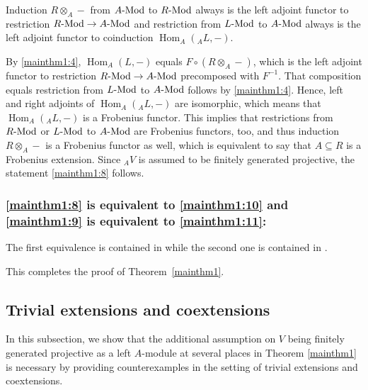 \documentclass[12pt,a4paper]{amsart}
\theoremstyle{plain}
\theoremstyle{definition}
\numberwithin{equation}{thm}
\DeclareMathOperator{\Hom}{Hom}
\newcommand{\Mod}[1]{#1\hbox{-}\mathrm{Mod}}
\begin{document}
Induction $R \otimes_A -$ from $\Mod{A}$ to $\Mod{R}$
always is  the left adjoint functor to restriction 
$\Mod{R} \rightarrow \Mod{A}$ and
restriction from $\Mod{L}$ to $\Mod{A}$ always
is  the left adjoint functor to coinduction $\Hom_A({}_AL,-)$.

By \eqref{mainthm1:4}, $\Hom_A(L,-)$ equals $F \circ (R \otimes_A-)$, which is the left adjoint functor
to restriction $\Mod{R} \rightarrow \Mod{A}$ precomposed with $F^{-1}$.
That composition equals restriction from $\Mod{L}$ to $\Mod{A}$ follows by \eqref{mainthm1:4}.
Hence, left and right adjoints of $\Hom_A({}_AL,-)$ are isomorphic, which means
that $\Hom_A({}_AL,-)$ is a Frobenius functor. This implies that restrictions
from $\Mod{R}$ or $\Mod{L}$ to $\Mod{A}$ are Frobenius functors, too, and
thus induction $R \otimes_A -$ is a Frobenius functor as well, which is equivalent to say that $A\subseteq R$ is a Frobenius extension. Since ${}_AV$ is assumed to be finitely generated projective, the statement \eqref{mainthm1:8} follows.

\subsubsection{\eqref{mainthm1:8} is equivalent to \eqref{mainthm1:10} and \eqref{mainthm1:9} is equivalent to \eqref{mainthm1:11}:}
The first equivalence is contained in \cite[27.10]{BW03} while the second one is contained in \cite[27.13]{BW03}.

\bigskip

This completes the proof of Theorem~\ref{mainthm1}.

\subsection{Trivial extensions and coextensions}\label{sec:nec_cond}

In this subsection, we show that the additional assumption on $V$ being finitely generated projective as a left $A$-module at several places in Theorem \ref{mainthm1} is necessary by providing counterexamples in the setting of trivial extensions and coextensions.
\end{document}
